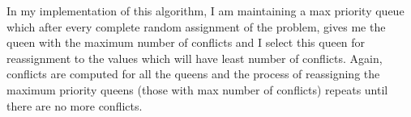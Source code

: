 \documentclass[conference]{IEEEtran}
\begin{document}
In my implementation of this algorithm, I am maintaining a max priority queue which after every complete random assignment of the problem, gives me the queen with the maximum number of conflicts and I select this queen for reassignment to the values which will have least number of conflicts. Again, conflicts are computed for all the queens and the process of reassigning the maximum priority queens (those with max number of conflicts) repeats until there are no more conflicts.


%
%



%
%
\end{document}
